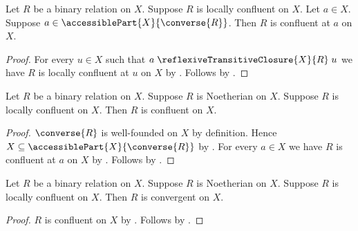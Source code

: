 \begin{corollary}\label{accessible_local_confluence_implies_confluent_at}
    Let $R$ be a binary relation on $X$.
    Suppose $R$ is locally confluent on $X$.
    Let $a\in X$.
    Suppose $a\in\accessiblePart{X}{\converse{R}}$.
    Then $R$ is confluent at $a$ on $X$.
\end{corollary}
\begin{proof}
    For every $u\in X$ such that
        $a\mathrel{\reflexiveTransitiveClosure{X}{R}}u$
        we have $R$ is locally confluent at $u$ on $X$
        by .
    Follows by
        .
\end{proof}

\begin{corollary}\label{newman_relation}
    Let $R$ be a binary relation on $X$.
    Suppose $R$ is Noetherian on $X$.
    Suppose $R$ is locally confluent on $X$.
    Then $R$ is confluent on $X$.
\end{corollary}
\begin{proof}
    $\converse{R}$ is well-founded on $X$ by definition.
    Hence $X\subseteq\accessiblePart{X}{\converse{R}}$
        by .
    For every $a\in X$ we have $R$ is confluent at $a$ on $X$
        by .
    Follows by .
\end{proof}

\begin{corollary}\label{newman_relation_convergent}
    Let $R$ be a binary relation on $X$.
    Suppose $R$ is Noetherian on $X$.
    Suppose $R$ is locally confluent on $X$.
    Then $R$ is convergent on $X$.
\end{corollary}
\begin{proof}
    $R$ is confluent on $X$ by .
    Follows by .
\end{proof}
